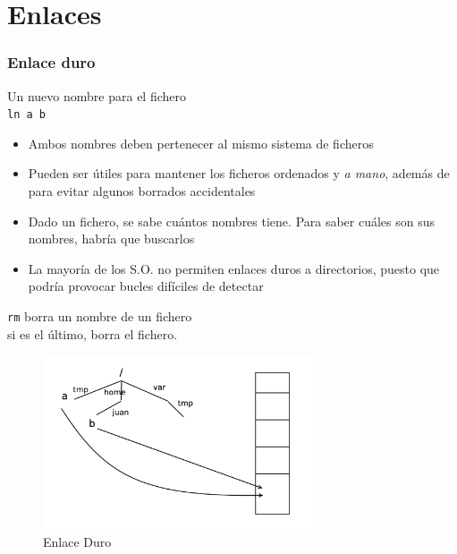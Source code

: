 \documentclass[ucs]{beamer}
\begin{document}
\section{Enlaces}
\begin{frame}[fragile]
\frametitle{Enlace duro}
Un nuevo nombre para el fichero\\
 \verb|ln a b|   
\begin{itemize} 
\item
Ambos nombres deben pertenecer al mismo sistema de ficheros 

\item
Pueden ser útiles para mantener los ficheros ordenados y  \emph{a mano}, además
de  para evitar algunos
borrados accidentales
\item

Dado un fichero, se sabe cuántos nombres tiene. Para saber cuáles son sus nombres, habría que buscarlos

\item
La mayoría de los S.O. no permiten enlaces duros a directorios, puesto que
podría provocar bucles difíciles de detectar

\end{itemize}
\verb|rm| borra un nombre de un fichero\\
si es el último, borra el fichero.\\

\end{frame}


\begin{frame}[fragile]
\begin{figure}
\centerline{\includegraphics[width=8cm]{figs/enlace_duro}}
\caption{Enlace Duro}
\end{figure}
\end{frame}
\end{document}
